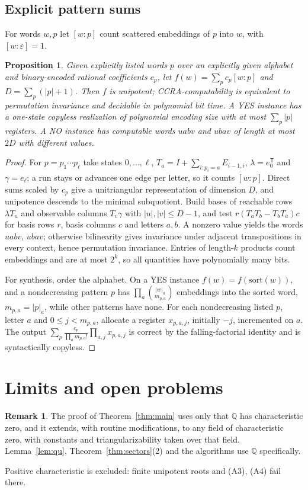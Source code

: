\documentclass[acmlarge,screen,11pt,nonacm,natbib=false]{acmart}
\newcommand{\Q}{\mathbb{Q}}
\newcommand{\eps}{\varepsilon}
\newtheorem{proposition}[theorem]{Proposition}
\theoremstyle{definition}
\newtheorem{remark}[theorem]{Remark}
\begin{document}
\subsection{Explicit pattern sums}
For words $w,p$ let $[w:p]$ count scattered embeddings of $p$ into $w$, with $[w:\eps]=1$.
\begin{proposition}\label{prop:patterns}
Given explicitly listed words $p$ over an explicitly given alphabet and binary-encoded rational coefficients $c_p$, let $f(w)=\sum_pc_p[w:p]$ and $D=\sum_p(|p|+1)$. Then $f$ is unipotent; CCRA-computability is equivalent to permutation invariance and decidable in polynomial bit time. A YES instance has a one-state copyless realization of polynomial encoding size with at most $\sum_p|p|$ registers. A NO instance has computable words $uabv$ and $ubav$ of length at most $2D$ with different values.
\end{proposition}
\begin{proof}
For $p=p_1\cdots p_\ell$ take states $0,\ldots,\ell$, $T_a=I+\sum_{i:p_i=a}E_{i-1,i}$, $\lambda=e_0^{\mathsf T}$ and $\gamma=e_\ell$; a run stays or advances one edge per letter, so it counts $[w:p]$. Direct sums scaled by $c_p$ give a unitriangular representation of dimension $D$, and unipotence descends to the minimal subquotient. Build bases of reachable rows $\lambda T_u$ and observable columns $T_v\gamma$ with $|u|,|v|\le D-1$, and test $r(T_aT_b-T_bT_a)c$ for basis rows $r$, basis columns $c$ and letters $a,b$. A nonzero value yields the words $uabv$, $ubav$; otherwise bilinearity gives invariance under adjacent transpositions in every context, hence permutation invariance. Entries of length-$k$ products count embeddings and are at most $2^k$, so all quantities have polynomially many bits.

For synthesis, order the alphabet. On a YES instance $f(w)=f(\mathrm{sort}(w))$, and a nondecreasing pattern $p$ has $\prod_a\binom{|w|_a}{m_{p,a}}$ embeddings into the sorted word, $m_{p,a}=|p|_a$, while other patterns have none. For each nondecreasing listed $p$, letter $a$ and $0\le j<m_{p,a}$, allocate a register $x_{p,a,j}$, initially $-j$, incremented on $a$. The output $\sum_p\frac{c_p}{\prod_am_{p,a}!}\prod_{a,j}x_{p,a,j}$ is correct by the falling-factorial identity and is syntactically copyless.
\end{proof}





\section{Limits and open problems}\label{sec:open}
\begin{remark} The proof of Theorem~\ref{thm:main} uses only that $\Q$ has characteristic zero, and it extends, with routine modifications, to any field of characteristic zero, with constants and triangularizability taken over that field. Lemma~\ref{lem:qu}, Theorem~\ref{thm:sectors}(2) and the algorithms use $\Q$ specifically. \end{remark} Positive characteristic is excluded: finite unipotent roots and (A3), (A4) fail there.
\end{document}
